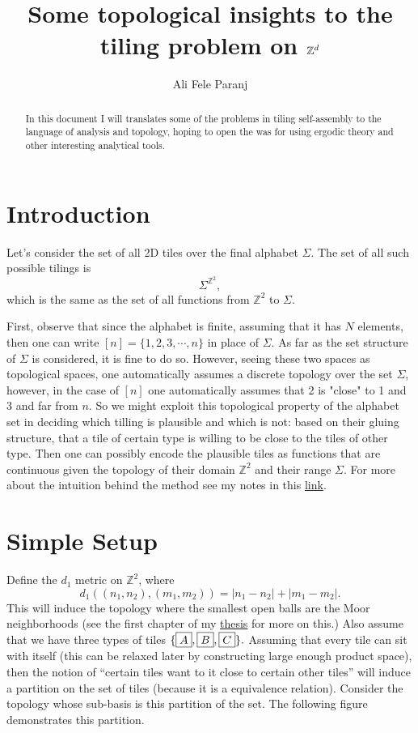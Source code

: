 \documentclass[11pt,a4paper]{article}
\title{Some topological insights to the tiling problem on $ \Z^d $}
\author{Ali Fele Paranj}
\newcommand{\Z}{\mathbb{Z}}
\newcommand{\tile}[1]{\fbox{\ensuremath{#1}}}
\theoremstyle{definition}
\theoremstyle{remark}
\theoremstyle{definition}
\begin{document}
	
	\maketitle
	\begin{abstract}
		In this document I will translates some of the problems in tiling self-assembly to the language of analysis and topology, hoping to open the was for using ergodic theory and other interesting analytical tools. 
	\end{abstract}
	
	
	\section{Introduction}
	
	Let's consider the set of all 2D tiles over the final alphabet $\Sigma$. The set of all such possible tilings is 
	$$ \Sigma^{\mathbb{Z}^2}, $$
	which is the same as the set of all functions from $\mathbb{Z}^2$ to $\Sigma$. 
	
	First, observe that since the alphabet is finite, assuming that it has $N$ elements, then one can write $[n] = \{1,2,3,\cdots,n\}$ in place of $\Sigma$. As far as the set structure of $\Sigma$ is considered, it is fine to do so. However, seeing these two spaces as topological spaces, one automatically assumes a discrete topology over the set $\Sigma$, however, in the case of $[n]$ one automatically assumes that 2 is "close" to 1 and 3 and far from $n$. So we might exploit this topological property of the alphabet set in deciding which tilling is plausible and which is not: based on their gluing structure, that a tile of certain type is willing to be close to the tiles of other type. Then one can possibly encode the plausible tiles as functions that are continuous given the topology of their domain $\mathbb{Z}^2$ and their range $\Sigma$. For more about the intuition behind the method see my notes in this \href{https://github.com/alifele/Lecture-Notes/blob/main/Scientific%20Notes/Some%20Intuitions%20on%20Continuous%20Maps/GraphHomologyAndCohomology.pdf}{link}.
	
	
	\section{Simple Setup}
	Define the $ d_1 $ metric on $ \Z^2 $, where
	\[ d_1\left( (n_1,n_2), (m_1,m_2) \right) = |n_1-n_2| + |m_1-m_2|. \]
	This will induce the topology where the smallest open balls are the Moor neighborhoods (see the first chapter of my \href{https://open.library.ubc.ca/soa/cIRcle/collections/ubctheses/24/items/1.0449873}{thesis} for more on this.) Also assume that we have three types of tiles $ \{ \tile{A}, \tile{B}, \tile{C} \}. $ Assuming that every tile can sit with itself (this can be relaxed later by constructing large enough product space), then the notion of ``certain tiles want to it close to certain other tiles'' will induce a partition on the set of tiles (because it is a equivalence relation). Consider the topology whose sub-basis is this partition of the set. The following figure demonstrates this partition.
	
\end{document}
